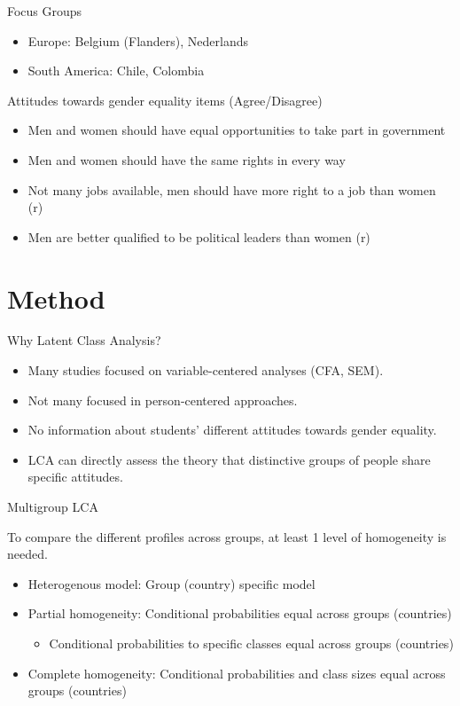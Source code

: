 \documentclass[11pt,t]{beamer}
\begin{document}
\begin{frame}{Focus}
Groups
\begin{itemize}
	\item Europe: Belgium (Flanders), Nederlands	
	\item South America: Chile, Colombia
\end{itemize}

\vspace{3.1mm} 

Attitudes towards gender equality items (Agree/Disagree)
\begin{itemize}
	\item Men and women should have equal opportunities to take part in government
	\item Men and women should have the same rights in every way
	\item Not many jobs available, men should have more right to a job than women (r)
	\item Men are better qualified to be political leaders than women (r)
\end{itemize}

\end{frame}

\section{Method}
\begin{frame}[plain]{Why Latent Class Analysis?}
\begin{itemize}
\item Many studies focused on variable-centered analyses (CFA, SEM). 

\item Not many focused in person-centered approaches.

\item No information about students' different attitudes towards gender equality.

\item LCA can directly assess the theory that distinctive groups of people share specific attitudes.
\end{itemize}

\end{frame}

\begin{frame}{Multigroup LCA}

To compare the different profiles across groups, at least 1 level of homogeneity is needed.

\begin{itemize}
	\item Heterogenous model: Group (country) specific model
	\item Partial homogeneity: Conditional probabilities equal across groups (countries)
	\begin{itemize}
		\item Conditional probabilities to specific classes equal across groups (countries)
	\end{itemize}
	\item Complete homogeneity: Conditional probabilities and class sizes equal across groups (countries)
\end{itemize}
\end{frame}
\end{document}
